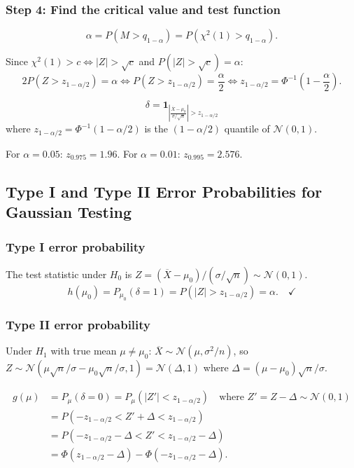\documentclass[11pt,a4paper]{article}
\begin{document}
\subsubsection{Step 4: Find the critical value and test function}

\[
  \alpha = P(M>q_{1-\alpha}) = P(\chi^2(1)>q_{1-\alpha}).
\]

Since $\chi^2(1)>c \iff |Z|>\sqrt{c}$ and $P(|Z|>\sqrt{c})=\alpha$:
\[
  2P(Z > z_{1-\alpha/2}) = \alpha \iff P(Z>z_{1-\alpha/2})=\frac{\alpha}{2} \iff z_{1-\alpha/2} = \Phi^{-1}\!\left(1-\frac{\alpha}{2}\right).
\]

\begin{tcolorbox}[thmbox, title={Bilateral Gaussian test (known variance) --- Final form}]
\[
  \boxed{\delta = \mathbf{1}_{\left|\frac{\overline{X}-\mu_0}{\sigma/\sqrt{n}}\right| > z_{1-\alpha/2}}}
\]
where $z_{1-\alpha/2}=\Phi^{-1}(1-\alpha/2)$ is the $(1-\alpha/2)$ quantile of $\mathcal{N}(0,1)$.

\medskip
For $\alpha=0.05$: $z_{0.975}=1.96$. \quad For $\alpha=0.01$: $z_{0.995}=2.576$.
\end{tcolorbox}

\subsection{Type I and Type II Error Probabilities for Gaussian Testing}

\subsubsection{Type I error probability}

The test statistic under $H_0$ is $Z=(\overline{X}-\mu_0)/(\sigma/\sqrt{n})\sim\mathcal{N}(0,1)$.
\[
  h(\mu_0) = P_{\mu_0}(\delta=1) = P(|Z|>z_{1-\alpha/2}) = \alpha. \quad\checkmark
\]

\subsubsection{Type II error probability}

Under $H_1$ with true mean $\mu\neq\mu_0$: $\overline{X}\sim\mathcal{N}(\mu,\sigma^2/n)$, so $Z\sim\mathcal{N}(\mu\sqrt{n}/\sigma - \mu_0\sqrt{n}/\sigma, 1) = \mathcal{N}(\Delta,1)$ where $\Delta = (\mu-\mu_0)\sqrt{n}/\sigma$.

\begin{align*}
  g(\mu) &= P_\mu(\delta=0) = P_\mu(|Z'|<z_{1-\alpha/2}) \quad\text{where } Z'=Z-\Delta\sim\mathcal{N}(0,1)\\
  &= P(-z_{1-\alpha/2}<Z'+\Delta<z_{1-\alpha/2})\\
  &= P(-z_{1-\alpha/2}-\Delta<Z'<z_{1-\alpha/2}-\Delta)\\
  &= \Phi(z_{1-\alpha/2}-\Delta) - \Phi(-z_{1-\alpha/2}-\Delta).
\end{align*}
\end{document}
